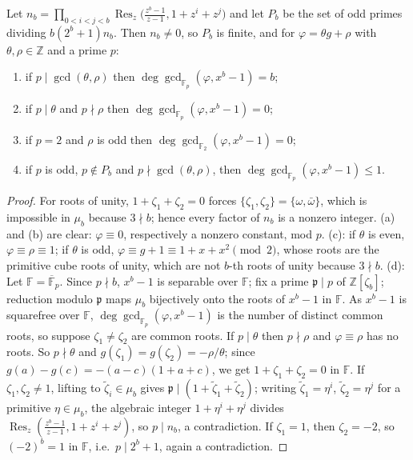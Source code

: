 \documentclass[12pt]{article}
\newcommand{\Z}{\mathbb{Z}}
\newcommand{\F}{\mathbb{F}}
\newcommand{\Res}{\operatorname{Res}}
\newcommand{\gpoly}{g}
\begin{document}
\begin{proposition}\label{prop:badprimes}
Let $n_b=\prod_{0<i<j<b}\Res_z\bigl(\frac{z^b-1}{z-1},1+z^i+z^j\bigr)$ and let $P_b$ be the set of odd primes dividing
$b(2^b+1)n_b$. Then $n_b\ne0$, so $P_b$ is finite, and for $\varphi=\theta\gpoly+\rho$ with $\theta,\rho\in\Z$ and a prime $p$:
\begin{enumerate}[label=(\alph*)]
\item if $p\mid\gcd(\theta,\rho)$ then $\deg\gcd_{\F_p}(\varphi,x^b-1)=b$;
\item if $p\mid\theta$ and $p\nmid\rho$ then $\deg\gcd_{\F_p}(\varphi,x^b-1)=0$;
\item if $p=2$ and $\rho$ is odd then $\deg\gcd_{\F_2}(\varphi,x^b-1)=0$;
\item if $p$ is odd, $p\notin P_b$ and $p\nmid\gcd(\theta,\rho)$, then $\deg\gcd_{\F_p}(\varphi,x^b-1)\le1$.
\end{enumerate}
\end{proposition}
\begin{proof}
For roots of unity, $1+\zeta_1+\zeta_2=0$ forces $\{\zeta_1,\zeta_2\}=\{\omega,\bar\omega\}$, which is impossible in $\mu_b$
because $3\nmid b$; hence every factor of $n_b$ is a nonzero integer. (a) and (b) are clear: $\varphi\equiv0$, respectively a
nonzero constant, mod $p$. (c): if $\theta$ is even, $\varphi\equiv\rho\equiv1$; if $\theta$ is odd,
$\varphi\equiv\gpoly+1\equiv1+x+x^2\pmod2$, whose roots are the primitive cube roots of unity, which are not $b$-th roots of
unity because $3\nmid b$.
(d): Let $\F=\overline{\F}_p$. Since $p\nmid b$, $x^b-1$ is separable over $\F$; fix a prime $\mathfrak p\mid p$ of
$\Z[\zeta_b]$; reduction modulo $\mathfrak p$ maps $\mu_b$ bijectively onto the roots of $x^b-1$ in $\F$.
As $x^b-1$ is squarefree over $\F$, $\deg\gcd_{\F_p}(\varphi,x^b-1)$ is the number of distinct common roots, so suppose
$\zeta_1\ne\zeta_2$ are common roots. If $p\mid\theta$ then $p\nmid\rho$ and $\varphi\equiv\rho$ has no roots. So $p\nmid\theta$
and $\gpoly(\zeta_1)=\gpoly(\zeta_2)=-\rho/\theta$; since $\gpoly(a)-\gpoly(c)=-(a-c)(1+a+c)$, we get $1+\zeta_1+\zeta_2=0$ in $\F$.
If $\zeta_1,\zeta_2\ne1$, lifting to $\tilde\zeta_i\in\mu_b$ gives $\mathfrak p\mid(1+\tilde\zeta_1+\tilde\zeta_2)$; writing
$\tilde\zeta_1=\eta^{i}$, $\tilde\zeta_2=\eta^{j}$ for a primitive $\eta\in\mu_b$, the algebraic integer $1+\eta^i+\eta^j$
divides $\Res_z(\frac{z^b-1}{z-1},1+z^i+z^j)$, so $p\mid n_b$, a contradiction. If $\zeta_1=1$, then $\zeta_2=-2$, so
$(-2)^b=1$ in $\F$, i.e.\ $p\mid2^b+1$, again a contradiction.
\end{proof}
\end{document}
